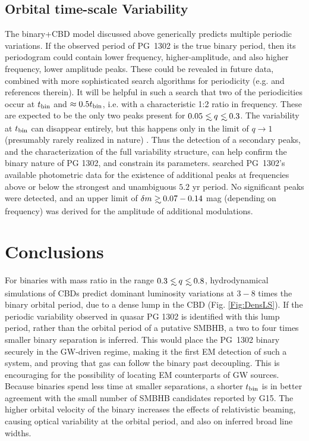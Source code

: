\subsection{Orbital time-scale Variability}
\label{SS:OTV}
The binary+CBD model discussed above generically predicts multiple
periodic variations. If the observed period of PG~1302 is the true
binary period, then its periodogram could contain lower frequency,
higher-amplitude, and also higher frequency, lower amplitude peaks.
These could be revealed in future data, combined with more
sophisticated search algorithms for periodicity
(e.g. \citealt{VanderPlasIvezic2015} and references therein).  It will
be helpful in such a search that two of the periodicities occur at
$t_{\rm{bin}}$ and $\approx 0.5t_{\rm{bin}}$, i.e. with a characteristic 1:2
ratio in frequency. These are expected to be the only two peaks
present for $0.05\lsim q \lsim 0.3$.  The variability at $t_{\rm{bin}}$
can disappear entirely, but this happens only in the limit of
$q\rightarrow1$ (presumably rarely realized in nature) .  Thus the
detection of a secondary peaks, and the characterization of the full
variability structure, can help confirm the binary nature of PG 1302,
and constrain its parameters.  \citet{PG1302-Maria} 
searched PG~1302's available
photometric data for the existence of additional peaks at frequencies
above or below the strongest and unambiguous $5.2$ yr period. No
significant peaks were detected, and an upper limit of $\delta m \gsim
0.07-0.14$ mag (depending on frequency) was derived for the amplitude of
additional modulations.






\vspace{-\baselineskip}
\section{Conclusions}
\label{S:Conclude}

For binaries with mass ratio in the range $0.3 \lsim q \lsim 0.8$,
hydrodynamical simulations of CBDs predict dominant
luminosity variations at $3-8$ times the binary orbital period, due to
a dense lump in the CBD (Fig. \ref{Fig:DensLS}). If the periodic
variability observed in quasar PG 1302 is identified with this lump
period, rather than the orbital period of a putative SMBHB, a two to four
times smaller binary separation is inferred. This would place the
PG~1302 binary securely in the GW-driven regime, making it the first
EM detection of such a system, and proving that gas can follow the
binary past decoupling. This is encouraging for the possibility of
locating EM counterparts of GW sources.  Because binaries spend less
time at smaller separations, a shorter $t_{\rm bin}$ is in better
agreement with the small number of SMBHB candidates reported by
G15. The higher orbital velocity of the binary increases the effects
of relativistic beaming, causing optical variability at the orbital
period, and also on inferred broad line widths.  

